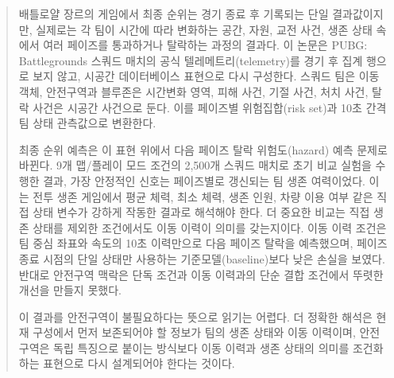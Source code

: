 \begin{abstract}
배틀로얄 장르의 게임에서 최종 순위는 경기 종료 후 기록되는 단일 결과값이지만,
실제로는 각 팀이 시간에 따라 변화하는 공간, 자원, 교전 사건, 생존 상태 속에서
여러 페이즈를 통과하거나 탈락하는 과정의 결과다. 이 논문은 PUBG: Battlegrounds
스쿼드 매치의 공식 텔레메트리(telemetry)를 경기 후 집계 행으로 보지 않고,
시공간 데이터베이스 표현으로 다시 구성한다. 스쿼드 팀은 이동 객체, 안전구역과
블루존은 시간변화 영역, 피해 사건, 기절 사건, 처치 사건, 탈락 사건은 시공간
사건으로 둔다. 이를 페이즈별 위험집합(risk set)과 10초 간격 팀 상태 관측값으로
변환한다.

최종 순위 예측은 이 표현 위에서 다음 페이즈 탈락 위험도(hazard) 예측 문제로
바뀐다. 9개 맵/플레이 모드 조건의 2,500개 스쿼드 매치로 초기 비교 실험을 수행한
결과, 가장 안정적인 신호는 페이즈별로 갱신되는 팀 생존 여력이었다. 이는 전투 생존
게임에서 평균 체력, 최소 체력, 생존 인원, 차량 이용 여부 같은 직접 상태 변수가
강하게 작동한 결과로 해석해야 한다. 더 중요한 비교는 직접 생존 상태를 제외한
조건에서도 이동 이력이 의미를 갖는지이다. 이동 이력
조건은 팀 중심 좌표와 속도의 10초 이력만으로 다음 페이즈 탈락을 예측했으며, 페이즈
종료 시점의 단일 상태만 사용하는 기준모델(baseline)보다 낮은 손실을 보였다. 반대로
안전구역 맥락은 단독 조건과 이동 이력과의 단순 결합 조건에서 뚜렷한 개선을 만들지
못했다.

이 결과를 안전구역이 불필요하다는 뜻으로 읽기는 어렵다. 더 정확한 해석은 현재
구성에서 먼저 보존되어야 할 정보가 팀의 생존 상태와 이동 이력이며, 안전구역은
독립 특징으로 붙이는 방식보다 이동 이력과 생존 상태의 의미를 조건화하는 표현으로
다시 설계되어야 한다는 것이다.
\end{abstract}
